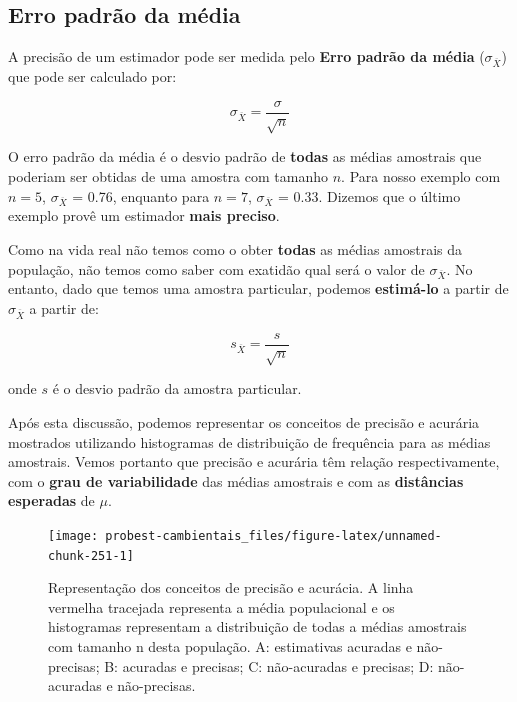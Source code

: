 \documentclass[
]{book}
\begin{document}
\hypertarget{erro-padruxe3o-da-muxe9dia}{%
\subsection{Erro padrão da média}\label{erro-padruxe3o-da-muxe9dia}}

A precisão de um estimador pode ser medida pelo \textbf{Erro padrão da média} (\(\sigma_{\overline{X}}\)) que pode ser calculado por:

\[\sigma_{\overline{X}} = \frac{\sigma}{\sqrt{n}}\]

O erro padrão da média é o desvio padrão de \textbf{todas} as médias amostrais que poderiam ser obtidas de uma amostra com tamanho \(n\). Para nosso exemplo com \(n = 5\), \(\sigma_{\overline{X}}\) = 0.76, enquanto para \(n = 7\), \(\sigma_{\overline{X}}\) = 0.33. Dizemos que o último exemplo provê um estimador \textbf{mais preciso}.

Como na vida real não temos como o obter \textbf{todas} as médias amostrais da população, não temos como saber com exatidão qual será o valor de \(\sigma_{\overline{X}}\). No entanto, dado que temos uma amostra particular, podemos \textbf{estimá-lo} a partir de \(\sigma_{\overline{X}}\) a partir de:

\[s_{\overline{X}} = \frac{s}{\sqrt{n}}\]

onde \(s\) é o desvio padrão da amostra particular.

Após esta discussão, podemos representar os conceitos de precisão e acurária mostrados utilizando histogramas de distribuição de frequência para as médias amostrais. Vemos portanto que precisão e acurária têm relação respectivamente, com o \textbf{grau de variabilidade} das médias amostrais e com as \textbf{distâncias esperadas} de \(\mu\).

\begin{figure}

{\centering \texttt{[image: probest-cambientais\_files/figure-latex/unnamed-chunk-251-1]} 

}

\caption{Representação dos conceitos de precisão e acurácia. A linha vermelha tracejada representa a média populacional e os histogramas representam a distribuição de todas a médias amostrais com tamanho n desta população. A: estimativas acuradas e não-precisas; B: acuradas e precisas; C: não-acuradas e precisas; D: não-acuradas e não-precisas.}\label{fig:unnamed-chunk-251}
\end{figure}
\end{document}
